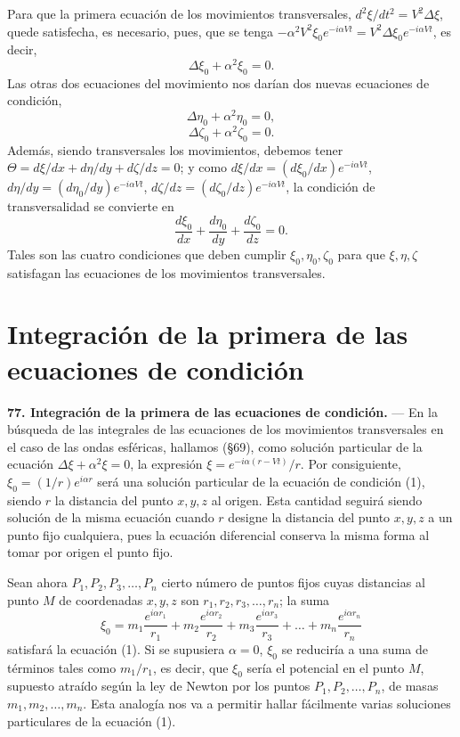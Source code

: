Para que la primera ecuación de los movimientos transversales,
$d^2\xi/dt^2=V^2\Delta\xi$, quede satisfecha, es necesario, pues, que se
tenga $-\alpha^2V^2\xi_0 e^{-i\alpha Vt} = V^2\Delta\xi_0 e^{-i\alpha Vt}$,
es decir,
\begin{equation}
\Delta\xi_0+\alpha^2\xi_0=0.
\tag{1}
\end{equation}
Las otras dos ecuaciones del movimiento nos darían dos nuevas ecuaciones
de condición,
\begin{equation}
\Delta\eta_0+\alpha^2\eta_0=0,
\tag{2}
\end{equation}
\begin{equation}
\Delta\zeta_0+\alpha^2\zeta_0=0.
\tag{3}
\end{equation}
Además, siendo transversales los movimientos, debemos tener
$\Theta=d\xi/dx+d\eta/dy+d\zeta/dz=0$; y como
$d\xi/dx=(d\xi_0/dx)e^{-i\alpha Vt}$,
$d\eta/dy=(d\eta_0/dy)e^{-i\alpha Vt}$,
$d\zeta/dz=(d\zeta_0/dz)e^{-i\alpha Vt}$, la condición de transversalidad
se convierte en
\begin{equation}
\frac{d\xi_0}{dx}+\frac{d\eta_0}{dy}+\frac{d\zeta_0}{dz}=0.
\tag{4}
\end{equation}
Tales son las cuatro condiciones que deben cumplir $\xi_0,\eta_0,\zeta_0$
para que $\xi,\eta,\zeta$ satisfagan las ecuaciones de los movimientos
transversales.

\section{Integración de la primera de las ecuaciones de condición}

\noindent\textbf{77. Integración de la primera de las ecuaciones de
condición.} — En la búsqueda de las integrales de las ecuaciones de los
movimientos transversales en el caso de las ondas esféricas, hallamos
(§69), como solución particular de la ecuación $\Delta\xi+\alpha^2\xi=0$,
la expresión $\xi=e^{-i\alpha(r-Vt)}/r$. Por consiguiente,
$\xi_0=(1/r)e^{i\alpha r}$ será una solución particular de la ecuación
de condición (1), siendo $r$ la distancia del punto $x,y,z$ al
origen. Esta cantidad seguirá siendo solución de la misma ecuación cuando
$r$ designe la distancia del punto $x,y,z$ a un punto fijo cualquiera,
pues la ecuación diferencial conserva la misma forma al tomar por origen
el punto fijo.

Sean ahora $P_1,P_2,P_3,\dots,P_n$ cierto número de puntos fijos cuyas
distancias al punto $M$ de coordenadas $x,y,z$ son $r_1,r_2,r_3,\dots,r_n$;
la suma
\[
\xi_0 = m_1\frac{e^{i\alpha r_1}}{r_1} + m_2\frac{e^{i\alpha r_2}}{r_2} +
m_3\frac{e^{i\alpha r_3}}{r_3} + \dots + m_n\frac{e^{i\alpha r_n}}{r_n}
\]
satisfará la ecuación (1). Si se supusiera $\alpha=0$, $\xi_0$ se
reduciría a una suma de términos tales como $m_1/r_1$, es decir, que
$\xi_0$ sería el potencial en el punto $M$, supuesto atraído según la ley
de Newton por los puntos $P_1,P_2,\dots,P_n$, de masas $m_1,m_2,\dots,m_n$.
Esta analogía nos va a permitir hallar fácilmente varias soluciones
particulares de la ecuación (1).

